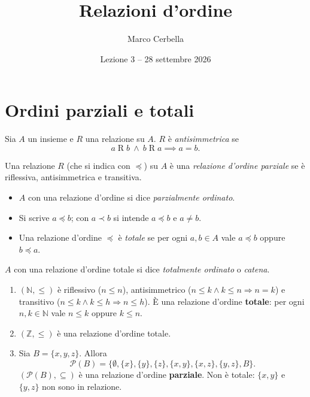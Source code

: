 \documentclass[11pt,a4paper]{article}
\title{Relazioni d'ordine}
\author{Marco Cerbella}
\date{Lezione 3 -- 28 settembre 2026}
\begin{document}
\maketitle

\section{Ordini parziali e totali}

\begin{definizione}
Sia $A$ un insieme e $R$ una relazione su $A$. $R$ è
\emph{antisimmetrica} se
\[
a \mathrel{R} b \ \land\ b \mathrel{R} a \implies a = b.
\]
\end{definizione}

\begin{definizione}
Una relazione $R$ (che si indica con $\preceq$) su $A$ è una
\emph{relazione d'ordine parziale} se è riflessiva, antisimmetrica e
transitiva.
\end{definizione}

\begin{itemize}
    \item $A$ con una relazione d'ordine si dice \emph{parzialmente
          ordinato}.
    \item Si scrive $a \preceq b$; con $a \prec b$ si intende
          $a \preceq b$ e $a \neq b$.
    \item Una relazione d'ordine $\preceq$ è \emph{totale} se per ogni
          $a, b \in A$ vale $a \preceq b$ oppure $b \preceq a$.
\end{itemize}
$A$ con una relazione d'ordine totale si dice \emph{totalmente ordinato}
o \emph{catena}.

\begin{esempio}
\leavevmode
\begin{enumerate}
    \item $(\mathbb{N}, \leq)$ è riflessivo ($n \leq n$), antisimmetrico
          ($n \leq k \land k \leq n \Rightarrow n = k$) e transitivo
          ($n \leq k \land k \leq h \Rightarrow n \leq h$). È una
          relazione d'ordine \textbf{totale}: per ogni $n, k \in
          \mathbb{N}$ vale $n \leq k$ oppure $k \leq n$.

    \item $(\mathbb{Z}, \leq)$ è una relazione d'ordine totale.

    \item Sia $B = \{x, y, z\}$. Allora
          \[
          \mathcal{P}(B) = \big\{\emptyset, \{x\}, \{y\}, \{z\},
          \{x,y\}, \{x,z\}, \{y,z\}, B\big\}.
          \]
          $(\mathcal{P}(B), \subseteq)$ è una relazione d'ordine
          \textbf{parziale}. Non è totale: $\{x, y\}$ e $\{y, z\}$ non
          sono in relazione.
\end{enumerate}
\end{esempio}
\end{document}
